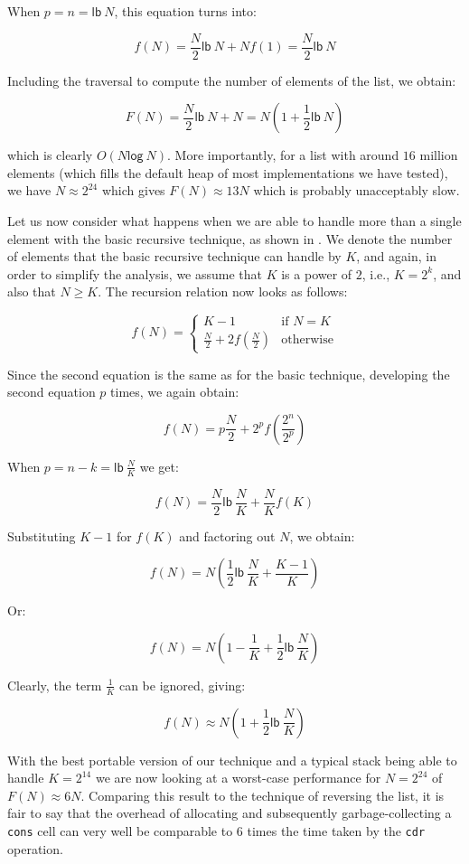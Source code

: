 When $p = n = \mathsf{lb}~N$, this equation turns into:

\[ f(N) = \frac{N}{2}\mathsf{lb}~N + Nf(1) = \frac{N}{2}\mathsf{lb}~N\]

Including the traversal to compute the number of elements of the list,
we obtain:

\[ F(N) = \frac{N}{2}\mathsf{lb}~N + N = N(1 + \frac{1}{2}\mathsf{lb}~N)\]

which is clearly $O(N\mathsf{log}~N)$.  More importantly, for a list
with around $16$ million elements (which fills the default heap of most
implementations we have tested), we have $N \approx 2^{24}$ which
gives $F(N) \approx 13N$ which is probably unacceptably slow.

Let us now consider what happens when we are able to handle more than
a single element with the basic recursive technique, as shown in
.  We denote the number of elements that the
basic recursive technique can handle by $K$, and again, in order to
simplify the analysis, we assume that $K$ is a power of $2$, i.e., $K
= 2^k$, and also that $N \ge K$.  The recursion relation now looks as
follows:

\[ f(N) = \left\{ \begin{array}{ll}
                    K-1 & \mbox{if $N = K$} \\
                    \frac{N}{2} + 2f(\frac{N}{2}) &\mbox{otherwise}
                  \end{array} \right. \]

Since the second equation is the same as for the basic technique,
developing the second equation $p$ times, we again obtain:

\[ f(N) = p\frac{N}{2} + 2^pf(\frac{2^n}{2^p})\]

When $p = n - k = \mathsf{lb}~\frac{N}{K}$ we get:

\[ f(N) = \frac{N}{2}\mathsf{lb}~\frac{N}{K} + \frac{N}{K}f(K)\]

Substituting $K-1$ for $f(K)$ and factoring out $N$, we obtain:

\[ f(N) = N(\frac{1}{2}\mathsf{lb}~\frac{N}{K} + \frac{K - 1}{K})\]

Or:

\[ f(N) = N(1 - \frac{1}{K} + \frac{1}{2}\mathsf{lb}~\frac{N}{K})\]

Clearly, the term $\frac{1}{K}$ can be ignored, giving:

\[ f(N) \approx N(1 + \frac{1}{2}\mathsf{lb}~\frac{N}{K})\]

With the best portable version of our technique and a typical stack
being able to handle $K = 2^{14}$ we are now looking at a worst-case
performance for $N = 2^{24}$ of $F(N) \approx 6N$.  Comparing this
result to the technique of reversing the list, it is fair to say that
the overhead of allocating and subsequently garbage-collecting a
\texttt{cons} cell can very well be comparable to $6$ times the time
taken by the \texttt{cdr} operation.

